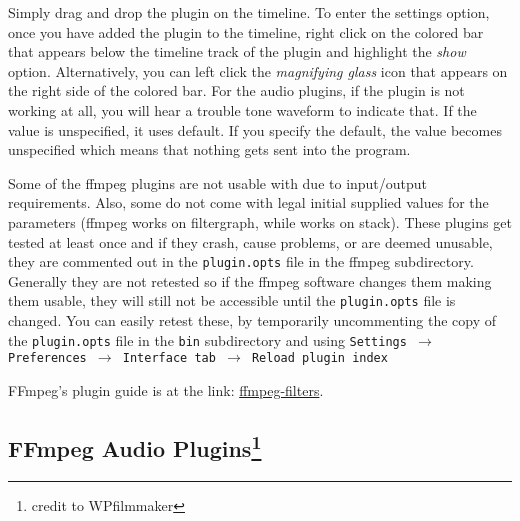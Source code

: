 Simply drag and drop the plugin on the timeline. To enter the settings option, once you have added the plugin to the timeline, right click on the colored bar that appears below the timeline track of the plugin and highlight the \textit{show} option. Alternatively, you can left click the \textit{magnifying glass} icon that appears on the right side of the colored bar. For the audio plugins, if the plugin is not working at all, you will hear a trouble tone waveform to indicate that. If the value is unspecified, it uses default. If you specify the default, the value becomes unspecified which means that nothing gets sent into the program.

Some of the ffmpeg plugins are not usable with \CGGI{} due to input/output requirements. Also, some do not come with legal initial supplied values for the parameters (ffmpeg works on filtergraph, while \CGG{} works on stack). These plugins get tested at least once and if they crash, cause problems, or are deemed unusable, they are commented out in the \texttt{plugin.opts} file in the \CGG{} ffmpeg subdirectory. Generally they are not retested so if the ffmpeg software changes them making them usable, they will still not be accessible until the \texttt{plugin.opts} file is changed. You can easily retest these, by temporarily uncommenting the copy of the \texttt{plugin.opts} file in the \texttt{bin} subdirectory and using \texttt{Settings $\rightarrow$ Preferences $\rightarrow$ Interface tab $\rightarrow$ Reload plugin index}

FFmpeg’s plugin guide is at the link:
\href{https://ffmpeg.org/ffmpeg-filters.html}{ffmpeg-filters}.

\subsection{FFmpeg Audio Plugins\protect\footnote{credit to WPfilmmaker}}%
\label{sub:ffmpeg_audio_plugins}

